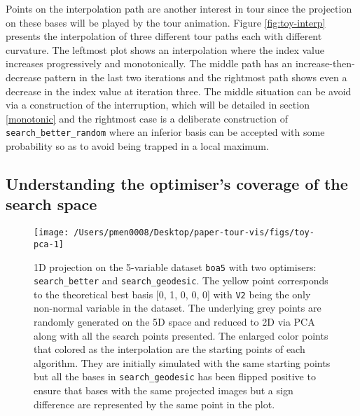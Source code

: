 \documentclass[12pt]{article}
\begin{document}
Points on the interpolation path are another interest in tour since the projection on these bases will be played by the tour animation. Figure \ref{fig:toy-interp} presents the interpolation of three different tour paths each with different curvature. The leftmost plot shows an interpolation where the index value increases progressively and monotonically. The middle path has an increase-then-decrease pattern in the last two iterations and the rightmost path shows even a decrease in the index value at iteration three. The middle situation can be avoid via a construction of the interruption, which will be detailed in section \ref{monotonic} and the rightmost case is a deliberate construction of \texttt{search\_better\_random} where an inferior basis can be accepted with some probability so as to avoid being trapped in a local maximum.

\hypertarget{understanding-the-optimisers-coverage-of-the-search-space}{%
\subsection{Understanding the optimiser's coverage of the search space}\label{understanding-the-optimisers-coverage-of-the-search-space}}

\begin{figure}

{\centering \texttt{[image: /Users/pmen0008/Desktop/paper-tour-vis/figs/toy-pca-1]} 

}

\caption{1D projection on the 5-variable dataset \texttt{boa5} with two optimisers: \texttt{search\_better} and \texttt{search\_geodesic}. The yellow point corresponds to the theoretical best basis {[}0, 1, 0, 0, 0{]} with \texttt{V2} being the only non-normal variable in the dataset. The underlying grey points are randomly generated on the 5D space and reduced to 2D via PCA along with all the search points presented. The enlarged color points that colored as the interpolation are the starting points of each algorithm. They are initially simulated with the same starting points but all the bases in \texttt{search\_geodesic} has been flipped positive to ensure that bases with the same projected images but a sign difference are represented by the same point in the plot.}\label{fig:toy-pca}
\end{figure}
\end{document}
